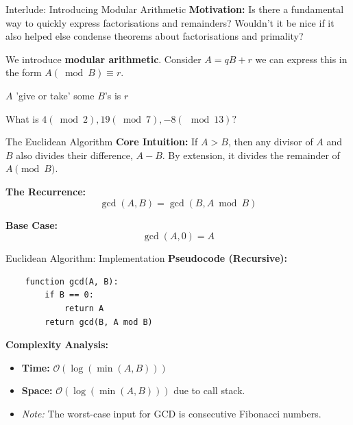 \documentclass[aspectratio=169]{beamer}
\begin{document}
\begin{frame}{Interlude: Introducing Modular Arithmetic}
    \textbf{Motivation:} Is there a fundamental way to quickly express factorisations and remainders? Wouldn't it be nice if it also helped else condense theorems about factorisations and primality?

    \pause 

    We introduce \textbf{modular arithmetic}. Consider $A = qB + r$ we can express this in the form $A (\bmod B) \equiv r$. 

    $A$ 'give or take' some $B$'s is $r$

    What is $4 (\bmod 2), 19 (\bmod 7), -8 (\mod 13)?$
\end{frame}

\begin{frame}{The Euclidean Algorithm}
    \textbf{Core Intuition:} 
    If $A > B$, then any divisor of $A$ and $B$ also divides their difference, $A - B$. By extension, it divides the remainder of $A \pmod B$.
    
    
    
    \vspace{0.5cm}
    \textbf{The Recurrence:}
    $$\gcd(A, B) = \gcd(B, A \bmod B)$$
    
    \textbf{Base Case:}
    $$\gcd(A, 0) = A$$
\end{frame}

\begin{frame}[fragile]{Euclidean Algorithm: Implementation}
    \textbf{Pseudocode (Recursive):}
    \begin{verbatim}
    function gcd(A, B):
        if B == 0:
            return A
        return gcd(B, A mod B)
    \end{verbatim}
    
    \vspace{0.5cm}
    \textbf{Complexity Analysis:}
    \begin{itemize}
        \item \textbf{Time:} $\mathcal{O}(\log(\min(A, B)))$
        \item \textbf{Space:} $\mathcal{O}(\log(\min(A, B)))$ due to call stack.
        \item \textit{Note:} The worst-case input for GCD is consecutive Fibonacci numbers.
    \end{itemize}
\end{frame}
\end{document}
